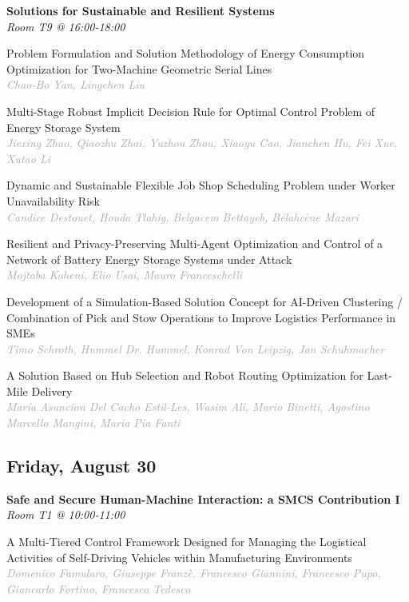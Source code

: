 \begin{multicols*}{2}
\normalsize \textbf{Solutions for Sustainable and Resilient Systems}\\
\small \textit{Room T9 @ 16:00-18:00}

\small Problem Formulation and Solution Methodology of Energy Consumption Optimization for Two-Machine Geometric Serial Lines\\ 
\footnotesize \textcolor{darkgray}{\textit{Chao-Bo Yan, Lingchen  Liu}}

\small Multi-Stage Robust Implicit Decision Rule for Optimal Control Problem of Energy Storage System\\ 
\footnotesize \textcolor{darkgray}{\textit{Jiexing Zhao, Qiaozhu  Zhai, Yuzhou  Zhou, Xiaoyu  Cao, Jianchen  Hu, Fei  Xue, Xutao  Li}}

\small Dynamic and Sustainable Flexible Job Shop Scheduling Problem under Worker Unavailability Risk\\ 
\footnotesize \textcolor{darkgray}{\textit{Candice Destouet, Houda  Tlahig, Belgacem  Bettayeb, Bélahcène  Mazari}}

\small Resilient and Privacy-Preserving Multi-Agent Optimization and Control of a Network of Battery Energy Storage Systems under Attack\\ 
\footnotesize \textcolor{darkgray}{\textit{Mojtaba Kaheni, Elio  Usai, Mauro  Franceschelli}}

\small Development of a Simulation-Based Solution Concept for AI-Driven Clustering / Combination of Pick and Stow Operations to Improve Logistics Performance in SMEs\\ 
\footnotesize \textcolor{darkgray}{\textit{Timo Schroth, Hummel  Dr. Hummel, Konrad  Von Leipzig, Jan  Schuhmacher}}

\small A Solution Based on Hub Selection and Robot Routing Optimization for Last-Mile Delivery\\ 
\footnotesize \textcolor{darkgray}{\textit{María Asuncion Del Cacho Estil-Les, Wasim  Ali, Mario  Binetti, Agostino Marcello  Mangini, Maria Pia  Fanti}}

\subsection*{Friday, August 30}

\normalsize \textbf{Safe and Secure Human-Machine Interaction: a SMCS Contribution I}\\
\small \textit{Room T1 @ 10:00-11:00}

\small A Multi-Tiered Control Framework Designed for Managing the Logistical Activities of Self-Driving Vehicles within Manufacturing Environments\\ 
\footnotesize \textcolor{darkgray}{\textit{Domenico Famularo, Giuseppe  Franzè, Francesco  Giannini, Francesco  Pupo, Giancarlo  Fortino, Francesco  Tedesco}}


\end{multicols*}
